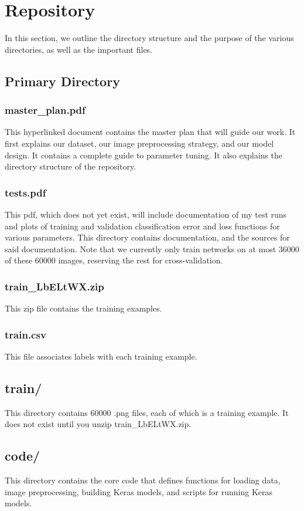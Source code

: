 \section{Repository}
In this section, we outline the directory structure and the purpose of the various directories, as well as the important files.
\subsection{Primary Directory}
\subsubsection{{\ttfamily master\_plan.pdf}}
This hyperlinked document contains the master plan that will guide our work. It first explains our dataset, our image preprocessing strategy, and our model design. It contains a complete guide to parameter tuning. It also explains the directory structure of the repository.
\subsubsection{{\ttfamily tests.pdf}}
This pdf, which does not yet exist, will include documentation of my test runs and plots of training and validation classification error and loss functions for various parameters. This directory contains documentation, and the sources for said documentation. Note that we currently only train networks on at most 36000 of these 60000 images, reserving the rest for cross-validation.
\subsubsection{{\ttfamily train\_LbELtWX.zip}}
This zip file contains the training examples.
\subsubsection{\ttfamily train.csv}
This file associates labels with each training example.
\subsection{{\ttfamily train/}}
This directory contains 60000 {\ttfamily .png} files, each of which is a training example. It does not exist until you unzip {\ttfamily train\_LbELtWX.zip}.
\subsection{{\ttfamily code/}}
This directory contains the core code that defines functions for loading data, image preprocessing, building Keras models, and scripts for running Keras models.
